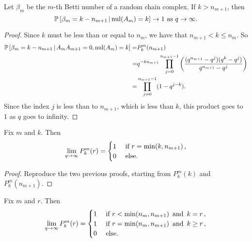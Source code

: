 
\begin{lemma}
  \label{lem:condqtoinfty2}
Let $\beta_m$ be the $m$-th Betti number of a random chain complex.  If $k > n_{m+1}$, then
\[
\mathbb{P}\left[\beta_m= k - n_{m+1} \,|\, \mathrm{nul}(A_{m}) = k \right] \to 1 \textrm{ as } q\to\infty.
\]
\end{lemma}

\begin{proof}
Since $k$ must be less than or equal to $n_m$, we have that $n_{m+1} < k \leq n_m$.  So
	\begin{align*}
	\mathbb{P}\left[\beta_m = k - n_{m+1} \,|\, A_{m}A_{m+1} = 0, \mathrm{nul}(A_{m}) = k \right]
    =& P^m_k(n_{m+1})\\
    =& q^{-kn_{m+1}}\prod_{j=0}^{n_{m+1}-1} \left(\frac{(q^{n_{m+1}} - q^j)(q^k - q^j)}{q^{n_{m+1}} - q^j}  \right)  \\
    =&  \prod_{j=0}^{n_{m+1}-1}(1-q^{j-k}).
	\end{align*}
Since the index $j$ is less than to $n_{m+1}$, which is less than $k$, this product goes to $1$ as $q$ goes to infinity.
\end{proof}


\begin{lemma}
  Fix $m$ and $k$. Then 
  \[
    \lim_{q \rightarrow \infty} P^m_k(r) = 
      \begin{cases}
        1 & \mbox{ if } r = \min(k,n_{m+1}) \, , \\
        0 & \mbox { else.}
      \end{cases}
    \]
\end{lemma}

\begin{proof}
  Reproduce the two previous proofs, starting from $P^m_k(k)$ and $P^m_k(n_{m+1})$.
\end{proof}

\begin{lemma}
  Fix $m$ and $r$. Then
  \[
    \lim_{q \rightarrow \infty} P^m_k(r) = 
      \begin{cases}
        1 & \mbox{ if } r < \min(n_m,n_{m+1}) \, \mbox{ and } \, k = r \, , \\
        1 & \mbox{ if } r = \min(n_m,n_{m+1}) \, \mbox{ and }  \, k \geq r \, , \\
        0 & \mbox { else.}
      \end{cases}
    \]
\end{lemma}


